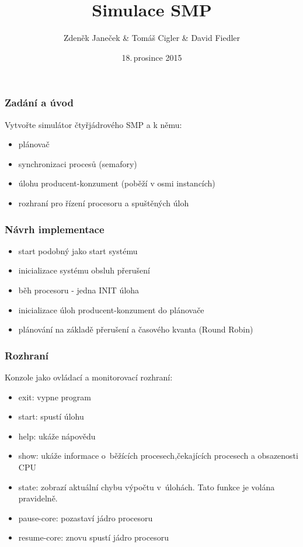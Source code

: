 \documentclass{beamer}
\title{Simulace SMP}
\author{Zdeněk Janeček \& Tomáš Cigler \& David Fiedler}
\date{18.\,prosince 2015}
\begin{document}
\begin{frame} 
\titlepage
\end{frame}

\begin{frame} 
\frametitle{Zadání a úvod}
Vytvořte simulátor čtyřjádrového SMP a k němu:

\begin{itemize}
\item plánovač
\item synchronizaci procesů (semafory)
\item úlohu producent-konzument (poběží v osmi instancích)
\item rozhraní pro řízení procesoru a spuštěných úloh
\end{itemize}

\end{frame}


\begin{frame} 
\frametitle{Návrh implementace}

\begin{itemize}
\item start podobný jako start systému
\item inicializace systému obsluh přerušení
\item běh procesoru - jedna INIT úloha
\item inicializace úloh producent-konzument do plánovače
\item plánování na základě přerušení a časového kvanta (Round Robin)
\end{itemize}


\end{frame}

\begin{frame} 
\frametitle{Rozhraní}

Konzole jako ovládací a monitorovací rozhraní:

\begin{itemize}
\item exit: vypne program
\item start: spustí úlohu
\item help: ukáže nápovědu
\item show: ukáže informace o~běžících procesech,čekajících procesech a obsazenosti CPU
\item state: zobrazí aktuální chybu výpočtu v~úlohách. Tato funkce je volána pravidelně.
\item pause-core: pozastaví jádro procesoru
\item resume-core: znovu spustí jádro procesoru
\end{itemize}

\end{frame}
\end{document}

